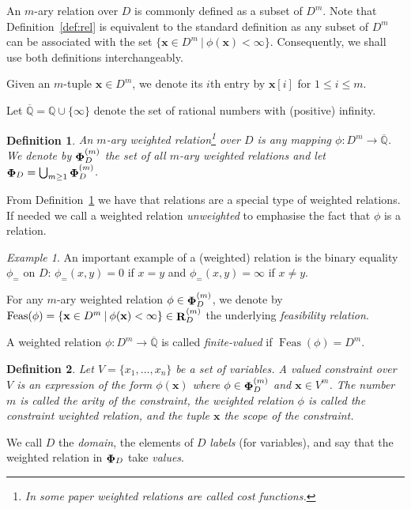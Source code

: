 \documentclass[11pt, reqno]{article}
\DeclareMathOperator{\rel}{{\bf R}}
\newcommand{\tup}[1]{\ensuremath{\mathbf #1}}
\DeclareMathOperator{\wrel}{{\bf \Phi}}
\DeclareMathOperator{\feas}{Feas}
\newcommand{\qq}{\ensuremath{\overline{\mathbb{Q}}}}
\newtheorem{definition}{Definition}
\theoremstyle{remark}
\newtheorem{example}{Example}
\begin{document}
An $m$-ary relation over $D$ is commonly defined as a subset of $D^m$. Note that
Definition~\ref{def:rel} is equivalent to the standard definition as any subset
of $D^m$ can be associated with the set $\{\tup{x}\in
D^m\:|\:\phi(\tup{x})<\infty\}$. Consequently, we shall use both definitions
interchangeably. 

Given an $m$-tuple $\tup{x}\in D^m$, we denote its $i$th entry by $\tup{x}[i]$ for $1\leq i\leq m$.

Let $\qq=\mathbb{Q}\cup\{\infty\}$ denote the set of rational numbers with (positive) infinity.

\begin{definition}\label{def:wrel}
An $m$-ary \emph{weighted relation}\footnote{In some paper weighted relations are called cost functions.} over $D$ is any mapping $\phi:D^m\to\qq$. 
We denote by $\wrel_D^{(m)}$ the set of all $m$-ary weighted relations and let
$\wrel_D=\bigcup_{m\ge 1}{\wrel_D^{(m)}}$. 
\end{definition}

From Definition~\ref{def:wrel} we have that relations are a special type of
weighted relations. 
%
If needed we call a weighted relation \emph{unweighted} to emphasise the fact that $\phi$ is a relation.

\begin{example}
An important example of a (weighted) relation is the binary equality $\phi_=$ on $D$:
$\phi_=(x,y)=0$ if $x=y$ and $\phi_=(x,y)=\infty$ if $x\neq y$.
\end{example}

For any $m$-ary weighted relation $\phi\in\wrel_D^{(m)}$, we denote by
$\feas(\phi)=\{\tup{x}\in D^m\:|\:\phi(\tup{x})<\infty\}\in\rel_D^{(m)}$ the
underlying \emph{feasibility relation}. 

A weighted relation $\phi:D^m\to\qq$ is called \emph{finite-valued} if
$\feas(\phi)=D^m$.

\begin{definition}
Let $V=\{x_1,\ldots, x_n\}$ be a set of variables. A \emph{valued constraint} over $V$ is an expression
of the form $\phi(\tup{x})$ where $\phi\in \wrel_D^{(m)}$ and $\tup{x}\in V^m$. The number $m$ is called the \emph{arity} of the constraint,
the weighted relation $\phi$ is called the \emph{constraint weighted relation},
and the tuple $\tup{x}$ the \emph{scope} of the constraint.
\end{definition}

We call $D$ the \emph{domain}, the elements of $D$ \emph{labels} (for variables), and say that the
weighted relation in $\wrel_D$ take \emph{values}.
\end{document}
